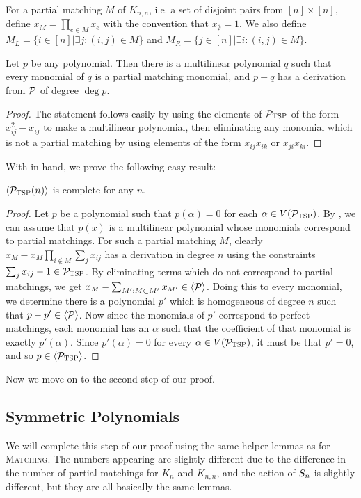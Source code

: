 For a partial matching $M$ of $K_{n,n}$, i.e. a set of disjoint pairs from $[n] \times [n]$, define $x_M = \prod_{e \in M} x_e$ with the convention that $x_{\emptyset} = 1$. We also define $M_L = \{i \in [n] | \exists j: (i,j) \in M\}$ and $M_R = \{j \in [n] | \exists i: (i,j) \in M\}$. 
\begin{lemma}\label{lem:tsp-monomials}
 Let $p$ be any polynomial. Then there is a multilinear polynomial $q$ such that every monomial of $q$ is a partial matching monomial, and $p-q$ has a derivation from $\mathcal P$ of degree $\deg p$.
\end{lemma}
\begin{proof}
The statement follows easily by using the elements of $\mathcal P_{\textsc{TSP}}$ of the form $x_{ij}^2 - x_{ij}$ to make a multilinear polynomial, then eliminating any monomial which is not a partial matching by using elements of the form $x_{ij}x_{ik}$ or $x_{ji}x_{ki}$. 
\end{proof}
With  in hand, we prove the following easy result:
\begin{lemma}\label{lem:tsp-complete}
$\langle \mathcal P_{\textsc{TSP}}(n) \rangle$ is complete for any $n$.  
\end{lemma}
\begin{proof}
Let $p$ be a polynomial such that $p(\alpha) = 0$ for each $\alpha \in V(\mathcal P_{\textsc{TSP}})$. By , we can assume that $p(x)$ is a multilinear polynomial whose monomials correspond to partial matchings. For such a partial matching $M$, clearly $x_M - x_M\prod_{i \notin M} \sum_j x_{ij}$ has a derivation in degree $n$ using the constraints $\sum_j x_{ij} - 1 \in \mathcal P_{\textsc{TSP}}$. By eliminating terms which do not correspond to partial matchings, we get $x_M - \sum_{M': M \subset M'} x_{M'} \in \langle \mathcal P \rangle$. Doing this to every monomial, we determine there is a polynomial $p'$ which is homogeneous of degree $n$ such that $p - p' \in \langle \mathcal P \rangle$. Now since the monomials of $p'$ correspond to perfect matchings, each monomial has an $\alpha$ such that the coefficient of that monomial is exactly $p'(\alpha)$. Since $p'(\alpha) = 0$ for every $\alpha \in V(\mathcal P_{\textsc{TSP}})$, it must be that $p' = 0$, and so $p \in \langle \mathcal P_{\textsc{TSP}} \rangle$.
\end{proof}
Now we move on to the second step of our proof. 

\subsection{Symmetric Polynomials}

We will complete this step of our proof using the same helper lemmas as for \textsc{Matching}. The numbers appearing are slightly different due to the difference in the number of partial matchings for $K_n$ and $K_{n,n}$, and the action of $S_{n}$ is slightly different, but they are all basically the same lemmas.

